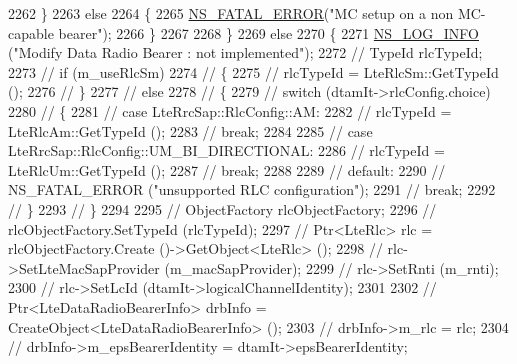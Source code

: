 \begin{DoxyCode}
2262             \}
2263             \textcolor{keywordflow}{else}
2264             \{
2265               \hyperlink{group__fatal_ga5131d5e3f75d7d4cbfd706ac456fdc85}{NS\_FATAL\_ERROR}(\textcolor{stringliteral}{"MC setup on a non MC-capable bearer"});
2266             \}
2267 
2268           \}
2269           \textcolor{keywordflow}{else}
2270           \{
2271             \hyperlink{group__logging_gafbd73ee2cf9f26b319f49086d8e860fb}{NS\_LOG\_INFO} (\textcolor{stringliteral}{"Modify Data Radio Bearer : not implemented"});
2272             \textcolor{comment}{// TypeId rlcTypeId;}
2273             \textcolor{comment}{// if (m\_useRlcSm)}
2274             \textcolor{comment}{//   \{}
2275             \textcolor{comment}{//     rlcTypeId = LteRlcSm::GetTypeId ();}
2276             \textcolor{comment}{//   \}}
2277             \textcolor{comment}{// else}
2278             \textcolor{comment}{//   \{}
2279             \textcolor{comment}{//     switch (dtamIt->rlcConfig.choice)}
2280             \textcolor{comment}{//       \{}
2281             \textcolor{comment}{//       case LteRrcSap::RlcConfig::AM: }
2282             \textcolor{comment}{//         rlcTypeId = LteRlcAm::GetTypeId ();}
2283             \textcolor{comment}{//         break;}
2284             
2285             \textcolor{comment}{//       case LteRrcSap::RlcConfig::UM\_BI\_DIRECTIONAL: }
2286             \textcolor{comment}{//         rlcTypeId = LteRlcUm::GetTypeId ();}
2287             \textcolor{comment}{//         break;}
2288             
2289             \textcolor{comment}{//       default:}
2290             \textcolor{comment}{//         NS\_FATAL\_ERROR ("unsupported RLC configuration");}
2291             \textcolor{comment}{//         break;                }
2292             \textcolor{comment}{//       \}}
2293             \textcolor{comment}{//   \}}
2294 
2295             \textcolor{comment}{// ObjectFactory rlcObjectFactory;}
2296             \textcolor{comment}{// rlcObjectFactory.SetTypeId (rlcTypeId);}
2297             \textcolor{comment}{// Ptr<LteRlc> rlc = rlcObjectFactory.Create ()->GetObject<LteRlc> ();}
2298             \textcolor{comment}{// rlc->SetLteMacSapProvider (m\_macSapProvider);}
2299             \textcolor{comment}{// rlc->SetRnti (m\_rnti);}
2300             \textcolor{comment}{// rlc->SetLcId (dtamIt->logicalChannelIdentity);}
2301 
2302             \textcolor{comment}{// Ptr<LteDataRadioBearerInfo> drbInfo = CreateObject<LteDataRadioBearerInfo> ();}
2303             \textcolor{comment}{// drbInfo->m\_rlc = rlc;}
2304             \textcolor{comment}{// drbInfo->m\_epsBearerIdentity = dtamIt->epsBearerIdentity;}

\end{DoxyCode}
